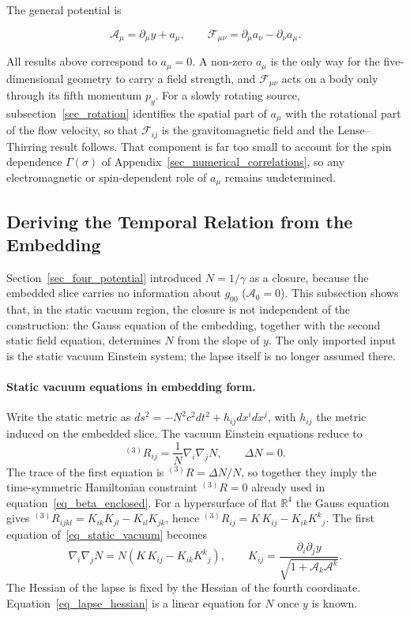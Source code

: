 \documentclass[pdflatex,sn-mathphys-num]{sn-jnl}%
\theoremstyle{thmstyleone}%
\theoremstyle{thmstyletwo}%
\theoremstyle{thmstylethree}%
\begin{document}
The general potential is

\begin{equation}
    \mathcal{A}_\mu=\partial_\mu y+a_\mu,
    \qquad
    \mathcal{F}_{\mu\nu}=\partial_\mu a_\nu-\partial_\nu a_\mu .
\end{equation}

All results above correspond to $a_\mu=0$. A non-zero $a_\mu$ is the only way for the five-dimensional geometry to carry a field strength, and $\mathcal{F}_{\mu\nu}$ acts on a body only through its fifth momentum $p_y$. For a slowly rotating source, subsection~\ref{sec_rotation} identifies the spatial part of $a_\mu$ with the rotational part of the flow velocity, so that $\mathcal{F}_{ij}$ is the gravitomagnetic field and the Lense--Thirring result follows. That component is far too small to account for the spin dependence $\Gamma(\sigma)$ of Appendix~\ref{sec_numerical_correlations}, so any electromagnetic or spin-dependent role of $a_\mu$ remains undetermined.


\subsection{Deriving the Temporal Relation from the Embedding}\label{sec_lapse_derivation}

Section~\ref{sec_four_potential} introduced $N=1/\gamma$ as a closure, because the embedded slice carries no information about $g_{00}$ ($\mathcal{A}_0=0$). This subsection shows that, in the static vacuum region, the closure is not independent of the construction: the Gauss equation of the embedding, together with the second static field equation, determines $N$ from the slope of $y$. The only imported input is the static vacuum Einstein system; the lapse itself is no longer assumed there.

\paragraph{Static vacuum equations in embedding form.}
Write the static metric as $ds^2=-N^2c^2dt^2+h_{ij}dx^idx^j$, with $h_{ij}$ the metric induced on the embedded slice. The vacuum Einstein equations reduce to
\begin{equation}\label{eq_static_vacuum}
    {}^{(3)}\!R_{ij}=\frac{1}{N}\nabla_i\nabla_jN,
    \qquad
    \Delta N=0 .
\end{equation}
The trace of the first equation is ${}^{(3)}\!R=\Delta N/N$, so together they imply the time-symmetric Hamiltonian constraint ${}^{(3)}\!R=0$ already used in equation~\eqref{eq_beta_enclosed}. For a hypersurface of flat $\mathbb{R}^4$ the Gauss equation gives ${}^{(3)}\!R_{ijkl}=K_{ik}K_{jl}-K_{il}K_{jk}$, hence ${}^{(3)}\!R_{ij}=K\,K_{ij}-K_{ik}K^{k}{}_{j}$. The first equation of~\eqref{eq_static_vacuum} becomes
\begin{equation}\label{eq_lapse_hessian}
    \boxed{
    \nabla_i\nabla_jN=N\left(K\,K_{ij}-K_{ik}K^{k}{}_{j}\right),
    \qquad
    K_{ij}=\frac{\partial_i\partial_jy}{\sqrt{1+\mathcal{A}_k\mathcal{A}^k}} .
    }
\end{equation}
The Hessian of the lapse is fixed by the Hessian of the fourth coordinate. Equation~\eqref{eq_lapse_hessian} is a linear equation for $N$ once $y$ is known.
\end{document}
